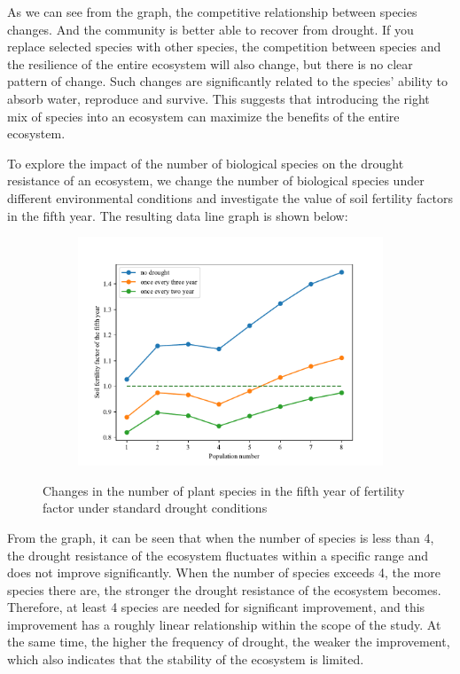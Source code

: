 \documentclass{mcmthesis}
\begin{document}
As we can see from the graph, the competitive relationship between species changes. And the community is better able to recover from drought. If you replace selected species with other species, the competition between species and the resilience of the entire ecosystem will also change, but there is no clear pattern of change. Such changes are significantly related to the species' ability to absorb water, reproduce and survive. This suggests that introducing the right mix of species into an ecosystem can maximize the benefits of the entire ecosystem.

To explore the impact of the number of biological species on the drought resistance of an ecosystem, we change the number of biological species under different environmental conditions and investigate the value of soil fertility factors in the fifth year. The resulting data line graph is shown below:

\begin{figure}[h]
\centering 
\begin{subfigure}{ 0.5\textwidth}
\includegraphics[width=\textwidth]{img/final.pdf}
\end{subfigure}
\caption{Changes in the number of plant species in the fifth year of fertility factor under standard drought conditions}
\label{fig:final}
\end{figure}

From the graph, it can be seen that when the number of species is less than 4, the drought resistance of the ecosystem fluctuates within a specific range and does not improve significantly. When the number of species exceeds 4, the more species there are, the stronger the drought resistance of the ecosystem becomes. Therefore, at least 4 species are needed for significant improvement, and this improvement has a roughly linear relationship within the scope of the study. At the same time, the higher the frequency of drought, the weaker the improvement, which also indicates that the stability of the ecosystem is limited.
\end{document}
